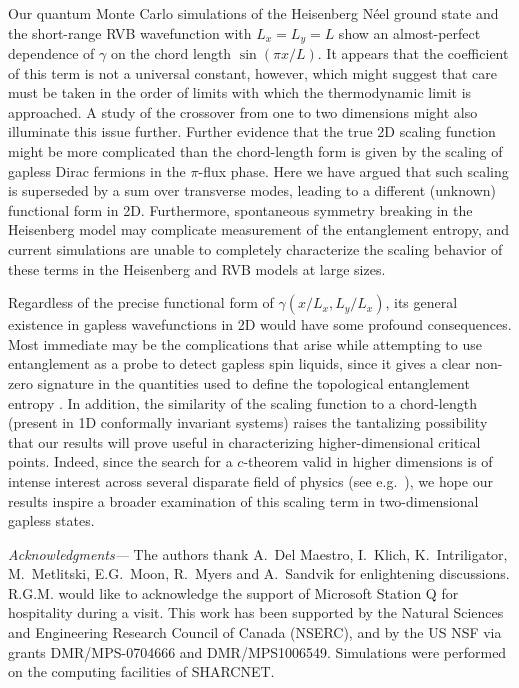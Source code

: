 \documentclass[prl,aps,twocolumn,floatfix,amsmath,amssymb,superscriptaddress,tightenlines]{revtex4}
\begin{document}
Our quantum Monte Carlo simulations of the Heisenberg N\'eel ground state and the short-range RVB wavefunction with $L_x=L_y=L$ show an almost-perfect dependence of $\gamma$ on the chord length $\sin(\pi x/L)$.
It appears that the coefficient of this term is not a universal constant, however, which might suggest that care must be taken in the order of limits with which the thermodynamic limit is approached. A study of the crossover from one to two dimensions might also illuminate this issue further.  Further evidence that the true 2D scaling function might be more complicated than the chord-length form is given by the scaling of gapless Dirac fermions in the $\pi$-flux phase. Here we have argued that such scaling is superseded by a sum over transverse modes, leading to a different (unknown) functional form in 2D.  Furthermore,  spontaneous symmetry breaking in the Heisenberg model may complicate measurement of the entanglement entropy, and current simulations are unable to completely characterize the scaling behavior of these terms in the Heisenberg and RVB models at large sizes.

Regardless of the precise functional form of $\gamma(x/L_x,L_y/L_x)$, its general existence in gapless wavefunctions in 2D would have some profound consequences.  
Most immediate may be the complications that arise while attempting to use entanglement as a probe to detect gapless spin liquids, since it gives a clear non-zero signature in the quantities used to define the topological entanglement entropy \cite{KP,LW}.
In addition, the similarity of the scaling function to a chord-length (present in 1D conformally invariant systems) 
raises the tantalizing possibility that our results will prove useful in characterizing higher-dimensional critical points.
Indeed, since the search for a $c$-theorem \cite{Zamo} valid in higher dimensions is of intense interest across several disparate field of physics (see e.g.\ \cite{Cardy88,ryu,Myers,Komargodski}),
we hope our results inspire a broader examination of this scaling term in two-dimensional gapless states.

{\it Acknowledgments---} 
The authors thank A.~Del Maestro, I.~Klich, K.~Intriligator,  M.~Metlitski, E.G.~Moon, R.~Myers and A.~Sandvik for enlightening discussions. 
R.G.M. would like to acknowledge the support of Microsoft Station Q for hospitality during a visit.
This work has been supported by the Natural Sciences and Engineering
Research Council of Canada (NSERC), and by the US NSF via grants DMR/MPS-0704666 and DMR/MPS1006549.  Simulations were performed on the computing facilities of SHARCNET.



\end{document}
